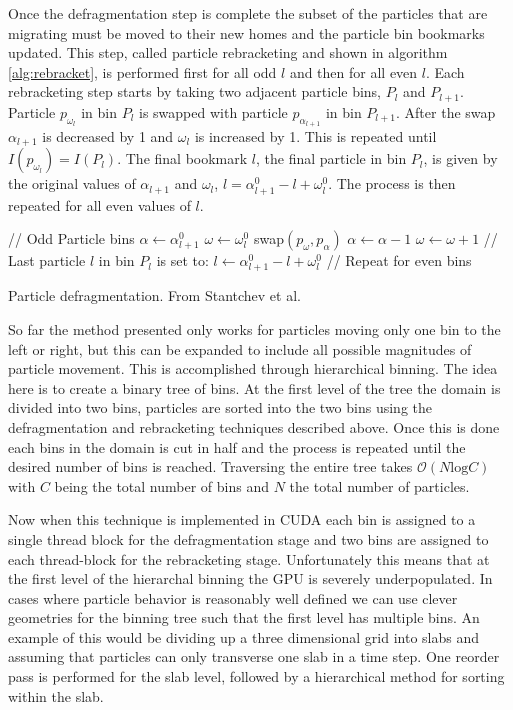  Once the defragmentation step is complete the subset of the particles that are migrating must be moved to their new homes and the particle bin bookmarks updated. This step, called particle rebracketing and shown in algorithm \ref{alg:rebracket}, is performed first for all odd $l$ and then for all even $l$. Each rebracketing step starts by taking two adjacent particle bins, $P_l$ and $P_{l+1}$. Particle $p_{\omega_l}$ in bin $P_{l}$ is swapped with particle $p_{\alpha_{l+1}}$ in bin $P_{l+1}$. After the swap $\alpha_{l+1}$ is decreased by 1 and $\omega_l$ is increased by 1. This is repeated until $I(p_{\omega_l}) = I(P_l)$. The final bookmark $l$, the final particle in bin $P_l$, is given by the original values of $\alpha_{l+1}$ and $\omega_l$, $l = \alpha_{l+1}^0 - l + \omega_l^0$. The process is then repeated for all even values of $l$.

\begin{algorithm}
	\begin{algorithmic}
		\STATE // Odd Particle bins
			\STATE $\alpha \leftarrow \alpha_{l+1}^0$
			\STATE $\omega \leftarrow \omega_l^0$
				\STATE swap$(p_\omega,p_\alpha)$
				\STATE $\alpha \leftarrow \alpha - 1$ 
				\STATE $\omega \leftarrow \omega + 1$ 		
			\ENDWHILE
			\STATE // Last particle $l$ in bin $P_l$ is set to:
			\STATE $l \leftarrow \alpha_{l+1}^0 - l + \omega_l^0$
		\ENDFOR
		\STATE // Repeat for even bins
	\end{algorithmic}
	\caption{Particle defragmentation. From Stantchev et al. \cite{Stantchev2008}}
	\label{alg:rebracket}
\end{algorithm}

	So far the method presented only works for particles moving only one bin to the left or right, but this can be expanded to include all possible magnitudes of particle movement. This is accomplished through hierarchical binning. The idea here is to create a binary tree of bins. At the first level of the tree the domain is divided into two bins, particles are sorted into the two bins using the defragmentation and rebracketing techniques described above. Once this is done each bins in the domain is cut in half and the process is repeated until the desired number of bins is reached. Traversing the entire tree takes $\mathcal{O}(N \mathrm{log} C)$ with $C$ being the total number of bins and $N$ the total number of particles. \cite{Stantchev2008}

Now when this technique is implemented in CUDA each bin is assigned to a single thread block for the defragmentation stage and two bins are assigned to each thread-block for the rebracketing stage.  Unfortunately this means that at the first level of the hierarchal binning the GPU is severely underpopulated. In cases where particle behavior is reasonably well defined we can use clever geometries for the binning tree such that the first level has multiple bins. An example of this would be dividing up a three dimensional grid into slabs and assuming that particles can only transverse one slab in a time step. One reorder pass is performed for the slab level, followed by a hierarchical method for sorting within the slab. 

